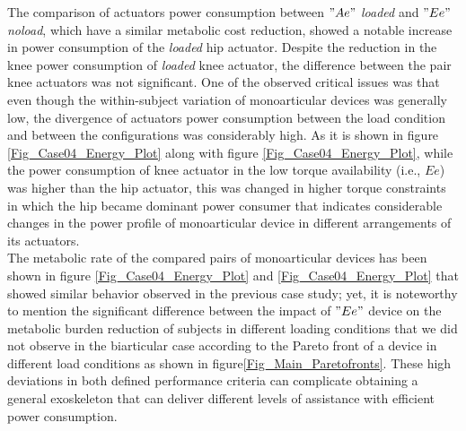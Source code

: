 \documentclass[10pt,letterpaper]{article}
\begin{document}
The comparison of actuators power consumption between $"Ae"$ {\it loaded} and $"Ee"$ {\it noload}, which have a similar metabolic cost reduction, showed a notable increase in power consumption of the {\it loaded} hip actuator. Despite the reduction in the knee power consumption of {\it loaded} knee actuator, the difference between the pair knee actuators was not significant. One of the observed critical issues was that even though the within-subject variation of monoarticular devices was generally low, the divergence of actuators power consumption between the load condition and between the configurations was considerably high. As it is shown in figure \ref{Fig_Case04_Energy_Plot} along with figure \ref{Fig_Case04_Energy_Plot}, while the power consumption of knee actuator in the low torque availability (i.e., $Ee$) was higher than the hip actuator, this was changed in higher torque constraints in which the hip became dominant power consumer that indicates considerable changes in the power profile of monoarticular device in different arrangements of its actuators.\\
The metabolic rate of the compared pairs of monoarticular devices has been shown in figure \ref{Fig_Case04_Energy_Plot} and \ref{Fig_Case04_Energy_Plot} that showed similar behavior observed in the previous case study; yet, it is noteworthy to mention the significant difference between the impact of $"Ee"$ device on the metabolic burden reduction of subjects in different loading conditions that we did not observe in the biarticular case according to the Pareto front of a device in different load conditions as shown in figure\ref{Fig_Main_Paretofronts}. These high deviations in both defined performance criteria can complicate obtaining a general exoskeleton that can deliver different levels of assistance with efficient power consumption.\\
\end{document}
